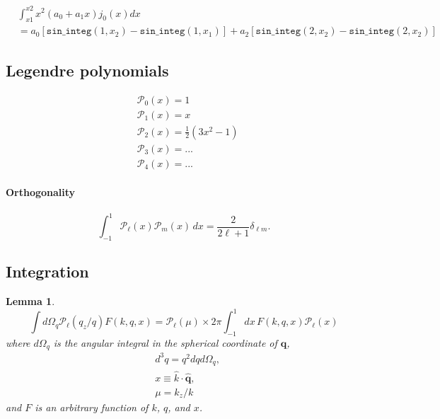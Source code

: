 \documentclass[a4paper,11pt, fleqn]{article}
\newtheorem{lemma}{Lemma}
\begin{document}
\vspace{5mm}

\begin{equation}\begin{split}
    &\int_{x1}^{x2} x^2 (a_0 + a_1 x) j_0(x) dx \\
    &=
    a_0 [\texttt{sin\_integ}(1, x_2) - \texttt{sin\_integ}(1, x_1)]
    + a_2 [\texttt{sin\_integ}(2, x_2) - \texttt{sin\_integ}(2, x_2)]
\end{split}\end{equation}

\clearpage
\subsection{Legendre polynomials}
\label{sec:legendre}

\begin{align}
  &\mathcal{P}_0(x) = 1\\
  &\mathcal{P}_1(x) = x\\
  &\mathcal{P}_2(x) = \frac{1}{2} (3x^2 - 1)\\
  &\mathcal{P}_3(x) = ...\\
  &\mathcal{P}_4(x) = ...
\end{align}

\vspace{4mm}

\paragraph{Orthogonality}
  
\begin{equation}
  \label{eq:legendre-orthognal}
  \int_{-1}^1 \mathcal{P}_\ell(x) \mathcal{P}_m(x) \, dx =
    \frac{2}{2\ell + 1} \delta_{\ell m}.
\end{equation}

\clearpage
\subsection{Integration}
\label{sec:integration}

\vspace{5mm}

\begin{lemma}
  \label{lemma-integral}
  \begin{equation}
    \label{eq:lemma-integral}
    \int \! d\Omega_q \mathcal{P}_\ell(q_z/q) F(k, q, x)
    = \mathcal{P}_\ell(\mu)
      \times 2\pi \int_{-1}^1 \! dx \, F(k, q, x) \mathcal{P}_\ell(x)
  \end{equation}
  where $d\Omega_q$ is the angular integral in the spherical coordinate
  of $\bm{q}$,
  \begin{align}
    &d^3 q = q^2 dq d\Omega_q,\\
    &x \equiv \hat{k}\cdot\hat{\bm{q}},\\
    &\mu = k_z/k
  \end{align}
  and $F$ is an arbitrary
  function of $k$, $q$, and $x$.
\end{lemma}
\end{document}
